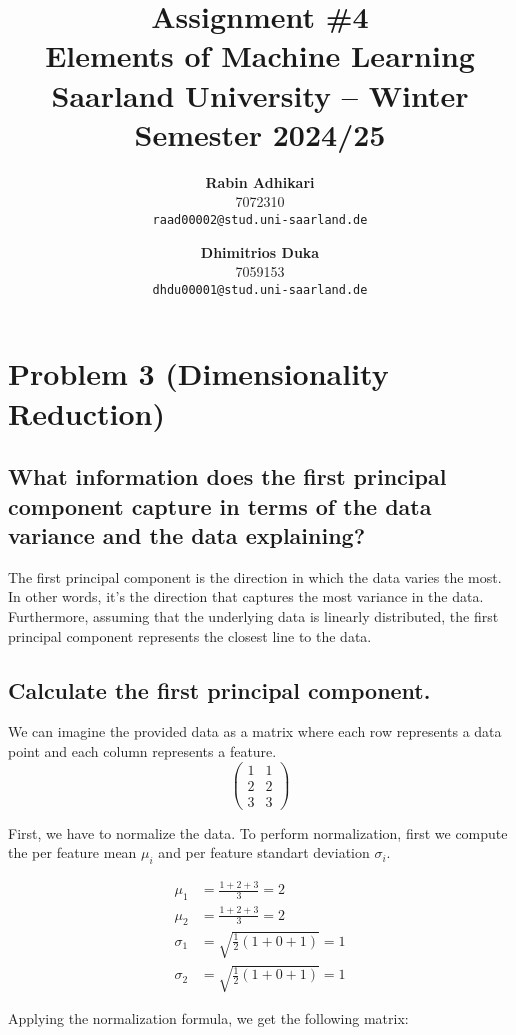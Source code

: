 \documentclass{article}
\title{Assignment \#4\\
  \vspace{2mm}
  \small{Elements of Machine Learning}
  \\
  \vspace{2mm}
  \small{Saarland University -- Winter Semester 2024/25}
}
\author{%
\textbf{Rabin Adhikari} \\
  7072310 \\
  \texttt{raad00002@stud.uni-saarland.de} \\
  \and
  \textbf{Dhimitrios Duka} \\
 7059153 \\
  \texttt{dhdu00001@stud.uni-saarland.de} \\
}
\begin{document}
\maketitle


\setcounter{section}{2}
\section{Problem 3 (Dimensionality Reduction)}
\subsection{What information does the first principal component capture in terms of the data variance and the
data explaining?}
The first principal component is the direction in which the data varies the most. In other words, it's the direction that captures the most variance in the data. Furthermore, assuming that the underlying data is linearly distributed, the first principal component represents the closest line to the data.

\subsection{Calculate the first principal component.}
We can imagine the provided data as a matrix where each row represents a data point and each column represents a feature.
\[
    \begin{pmatrix}
        1 & 1 \\
        2 & 2 \\
        3 & 3
    \end{pmatrix}
\]

First, we have to normalize the data. To perform normalization, first we compute the per feature mean $\mu_i$ and per feature standart deviation $\sigma_i$.

\begin{equation}
    \begin{aligned}
        \mu_1 &= \frac{1 + 2 + 3}{3} = 2 \\
        \mu_2 &= \frac{1 + 2 + 3}{3} = 2 \\
        \sigma_1 &= \sqrt{\frac{1}{2} (1 + 0 + 1)} = 1 \\
        \sigma_2 &= \sqrt{\frac{1}{2} (1 + 0 + 1)} = 1
    \end{aligned}
\end{equation}

Applying the normalization formula, we get the following matrix:
\end{document}
